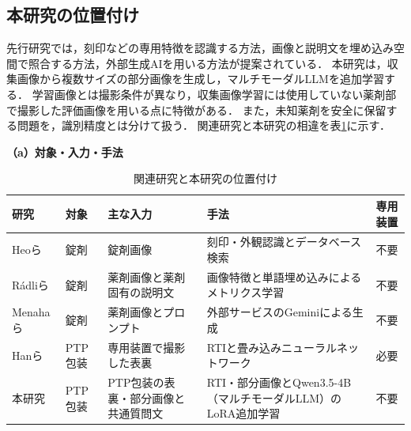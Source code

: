 \documentclass[uplatex,dvipdfmx]{jsarticle}
\begin{document}
\subsection{本研究の位置付け}

先行研究では，刻印などの専用特徴を認識する方法，画像と説明文を埋め込み空間で照合する方法，外部生成AIを用いる方法が提案されている．
本研究は，収集画像から複数サイズの部分画像を生成し，マルチモーダルLLMを追加学習する．
学習画像とは撮影条件が異なり，収集画像学習には使用していない薬剤部で撮影した評価画像を用いる点に特徴がある．
また，未知薬剤を安全に保留する問題を，識別精度とは分けて扱う．
関連研究と本研究の相違を表\ref{tab:related_comparison}に示す．

\begin{table}[H]
  \centering
  \caption{関連研究と本研究の位置付け}
  \label{tab:related_comparison}
  \small
  \renewcommand{\arraystretch}{1.25}
  \setlength{\tabcolsep}{3.5pt}
  \textbf{（a）対象・入力・手法}\\[1mm]
  \begin{tabularx}{\textwidth}{|>{\raggedright\arraybackslash}p{1.55cm}|>{\raggedright\arraybackslash}p{1.4cm}|>{\raggedright\arraybackslash}X|>{\raggedright\arraybackslash}X|>{\centering\arraybackslash}p{1.25cm}|}
    \hline
    研究 & 対象 & 主な入力 & 手法 & 専用装置 \\ \hline
    Heoら\cite{heo2023pill} & 錠剤 & 錠剤画像 & 刻印・外観認識とデータベース検索 & 不要 \\ \hline
    Rádliら\cite{radli2024word,radli2024metric} & 錠剤 & 薬剤画像と薬剤固有の説明文 & 画像特徴と単語埋め込みによるメトリクス学習 & 不要 \\ \hline
    Menahaら\cite{menaha2024gemini} & 錠剤 & 薬剤画像とプロンプト & 外部サービスのGeminiによる生成 & 不要 \\ \hline
    Hanら\cite{han2021blister} & PTP包装 & 専用装置で撮影した表裏 & RTIと畳み込みニューラルネットワーク & 必要 \\ \hline
    本研究 & PTP包装 & PTP包装の表裏・部分画像と共通質問文 & RTI・部分画像とQwen3.5-4B（マルチモーダルLLM）のLoRA追加学習 & 不要 \\ \hline
  \end{tabularx}


\end{table}
\end{document}
